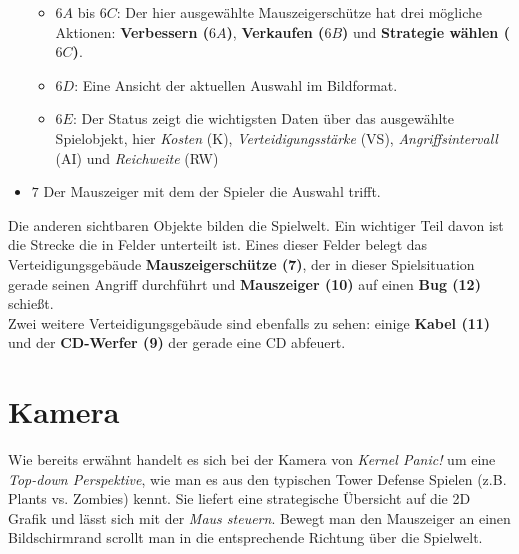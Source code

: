 \begin{itemize}
\begin{itemize}
		\item{$6 A$ bis $6 C$: Der hier ausgewählte Mauszeigerschütze hat drei mögliche Aktionen: \textbf{Verbessern ($6 A$)}, \textbf{Verkaufen ($6 B$)} und \textbf{Strategie wählen ($6 C$)}.}
		\item{$6 D$: Eine Ansicht der aktuellen Auswahl im Bildformat.}
		\item{$6 E$: Der Status zeigt die wichtigsten Daten über das ausgewählte Spielobjekt, hier \textit{Kosten} (K), \textit{Verteidigungsstärke} (VS), \textit{Angriffsintervall }(AI) und \textit{Reichweite} (RW)}
	\end{itemize}
	\item {$7$ Der Mauszeiger mit dem der Spieler die Auswahl trifft.} 
\end{itemize}
Die anderen sichtbaren Objekte bilden die Spielwelt. Ein wichtiger Teil davon ist die Strecke die in Felder unterteilt ist. Eines dieser Felder belegt das Verteidigungsgebäude \textbf{Mauszeigerschütze (7)}, der in dieser Spielsituation gerade seinen Angriff durchführt und \textbf{Mauszeiger (10)} auf einen \textbf{Bug (12)} schießt.\\
Zwei weitere Verteidigungsgebäude sind ebenfalls zu sehen: einige \textbf{Kabel (11)} und der \textbf{CD-Werfer (9)} der gerade eine CD abfeuert.

\section{Kamera}
Wie bereits erwähnt handelt es sich bei der Kamera von \textit{Kernel Panic!} um eine \textit{Top-down Perspektive}, wie man es aus den typischen Tower Defense Spielen (z.B. Plants vs. Zombies) kennt.
Sie liefert eine strategische Übersicht auf die 2D Grafik und lässt sich mit der \textit{Maus steuern}.
Bewegt man den Mauszeiger an einen Bildschirmrand scrollt man in die entsprechende Richtung über die Spielwelt.

